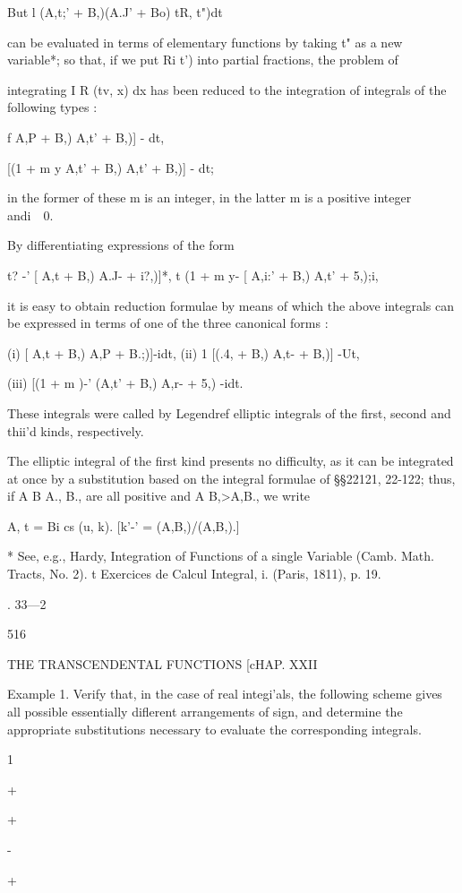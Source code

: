 But l (A,t;' + B,)(A.J' + Bo) tR, t")dt

can be evaluated in terms of elementary functions by taking t" as a
new variable*; so that, if we put Ri t') into partial fractions, the
problem of

integrating I R (tv, x) dx has been reduced to the integration of
integrals of the following types :

 f A,P + B,) A,t' + B,)] - dt,

[(1 + m y A,t' + B,) A,t' + B,)] - dt;

in the former of these m is an integer, in the latter m is a positive
integer andi\ \ 0.

By differentiating expressions of the form

t? -' [ A,t + B,) A.J- + i?,)]*, t (1 + m y- [ A,i:' + B,) A,t' +
5,);i,

it is easy to obtain reduction formulae by means of which the above
integrals can be expressed in terms of one of the three canonical
forms :

(i) [ A,t + B,) A,P + B.;)]-idt, (ii) 1 [(.4, + B,) A,t- + B,)] -Ut,

(iii) [(1 + m )-' (A,t' + B,) A,r- + 5,) -idt.

These integrals were called by Legendref elliptic integrals of the
first, second and thii'd kinds, respectively.

The elliptic integral of the first kind presents no difficulty, as it
can be integrated at once by a substitution based on the integral
formulae of §§22121, 22-122; thus, if A B A., B., are all positive and
A B,>A,B., we write

A, t = Bi cs (u, k). [k'-' = (A,B,)/(A,B,).]

* See, e.g., Hardy, Integration of Functions of a single Variable
(Camb. Math. Tracts, No. 2). t Exercices de Calcul Integral, i.
(Paris, 1811), p. 19.

. 33—2

516

THE TRANSCENDENTAL FUNCTIONS [cHAP. XXII

Example 1. Verify that, in the case of real integi'als, the following
scheme gives all possible essentially diflerent arrangements of sign,
and determine the appropriate substitutions necessary to evaluate the
corresponding integrals.

 1

+

+

-

+

